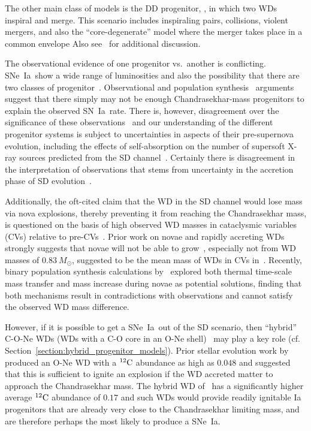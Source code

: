 \documentclass[iop,apj]{emulateapj}
\newcommand{\secref}[1]{Section~\ref{#1}}
\newcommand{\SNeIa}{SNe~Ia}
\newcommand{\SNIa}{SN~Ia}
\newcommand{\C}[1]{\ensuremath{{}^{#1}{\rm C}}}
\newcommand{\Msun}{\ensuremath{M_\odot}}
\begin{document}
The other main class of models is the DD progenitor,
\citep{webbink84,ibentutukov84}, in which two WDs inspiral and merge.
This scenario includes inspiraling pairs, collisions, violent mergers,
and also the ``core-degenerate'' model where the merger takes place in
a common envelope
\citep{raskinetal2009,pakmoretal2011,kashi:2011,pakmoretal2012a,Shenetal12}
Also
see~\citet{hillebrandt.niemeyer:type,howell2011,hillebrandtetal2013,calderetal2013}
for additional discussion.

The observational evidence of one progenitor vs.\ another is
conflicting. \SNeIa\ show a wide range of luminosities and also the
possibility that there are two classes of
progenitor~\citep{MannucciEtAl06,howelletal+09,howell2011}. Observational
and population synthesis~\citep{yungelsonlivio2000, Maoz2008,
  Toonenetal2012, Claeysetal2014} arguments suggest that there simply
may not be enough Chandrasekhar-mass progenitors to explain the
observed \SNIa\ rate.  There is, however, disagreement over the
significance of these observations~\citep{hachisu:2008} and our
understanding of the different progenitor systems is subject to
uncertainties in aspects of their pre-supernova evolution, including
the effects of self-absorption on the number of supersoft X-ray
sources predicted from the SD
channel~\citep{Nielsenetal2013}. Certainly there is disagreement in
the interpretation of observations that stems from uncertainty in the
accretion phase of SD evolution~\citep{hachisu:2010}.

Additionally, the oft-cited claim that the WD in the SD channel would
lose mass via nova explosions, thereby preventing it from reaching the
Chandrasekhar mass, is questioned on the basis of high observed WD
masses in cataclysmic variables (CVs) relative to
pre-CVs~\citep{Zorotovic:2011}. Prior work on novae and rapidly
accreting WDs strongly suggests that novae will not be able to
grow~\citep{denissenkovetal2013b,denissenkovetal2014}, especially not
from WD masses of $0.83~\Msun$, suggested to be the mean mass of WDs
in CVs in~\citet{Zorotovic:2011}. Recently, binary population
synthesis calculations by~\citet{Wijnenetal2015} explored both thermal
time-scale mass transfer and mass increase during novae as potential
solutions, finding that both mechanisms result in contradictions with
observations and cannot satisfy the observed WD mass difference.

However, if it is possible to get a \SNeIa\ out of the SD scenario,
then ``hybrid'' C-O-Ne WDs (WDs with a C-O core in an O-Ne
shell)~\citep{denissenkovetal2015} may play a key role (cf.
\secref{section:hybrid_progenitor_models}). Prior stellar evolution
work by~\citet{GarciaBerroetal1997} produced an O-Ne WD with a \C{12}
abundance as high as $0.048$ and suggested that this is sufficient to
ignite an explosion if the WD accreted matter to approach the
Chandrasekhar mass. The hybrid WD of~\citet{denissenkovetal2015} has a
significantly higher average \C{12} abundance of $0.17$ and such WDs
would provide readily ignitable Ia progenitors that are already very
close to the Chandrasekhar limiting mass, and are therefore perhaps
the most likely to produce a \SNeIa.
\end{document}
